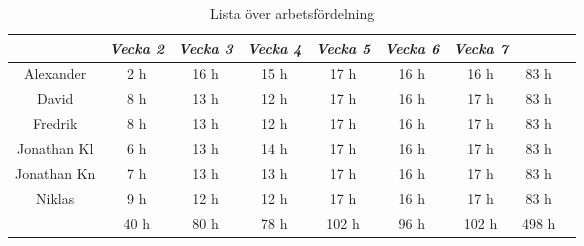 \documentclass[10pt]{article}
\begin{document}
\begin{table}[htbp]
    \begin{center}
        \begin{tabular}{ |c|c|c|c|c|c|c||c|c| }
        \hline
         & \emph{Vecka 2} & \emph{Vecka 3} & \emph{Vecka 4} & \emph{Vecka 5} &              \emph{Vecka 6} & \emph{Vecka 7} & \\
        \hline
        Alexander & 2 h & 16 h & 15 h & 17 h & 16 h & 16 h & 83 h\\
        David & 8 h & 13 h & 12 h & 17 h & 16 h & 17 h & 83 h\\
        Fredrik & 8 h & 13 h & 12 h & 17 h & 16 h & 17 h & 83 h\\
        Jonathan Kl & 6 h & 13 h & 14 h & 17 h & 16 h & 17 h & 83 h\\
        Jonathan Kn & 7 h & 13 h & 13 h & 17 h & 16 h & 17 h & 83 h\\
        Niklas & 9 h & 12 h & 12 h & 17 h & 16 h & 17 h & 83 h\\
        \hline
        \hline
         & 40 h & 80 h & 78 h & 102 h & 96 h & 102 h & 498 h\\
        \hline
        \end{tabular}
    \end{center}
    \caption{Lista över arbetsfördelning}
\end{table}
\end{document}
